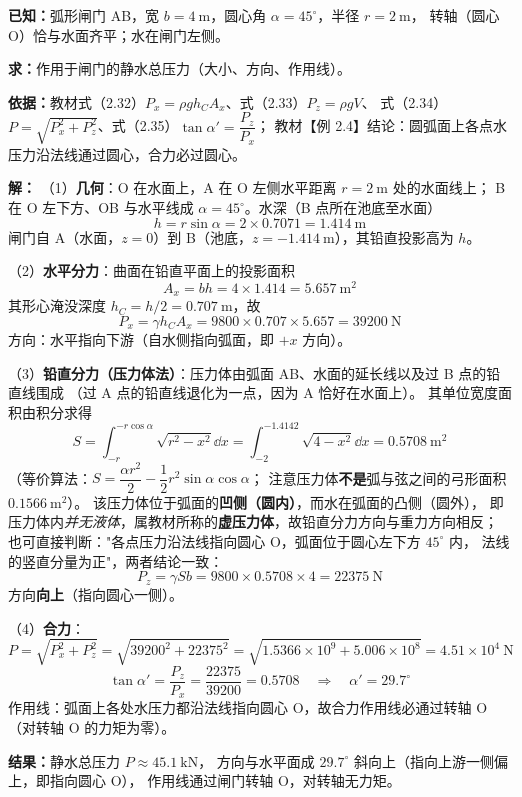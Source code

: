 \begin{jie}
\textbf{已知：}弧形闸门 AB，宽 $b=4\ \mathrm{m}$，圆心角 $\alpha=45^{\circ}$，半径 $r=2\ \mathrm{m}$，
转轴（圆心 O）恰与水面齐平；水在闸门左侧。

\textbf{求：}作用于闸门的静水总压力（大小、方向、作用线）。

\textbf{依据：}教材式（2.32）$P_x=\rho gh_CA_x$、式（2.33）$P_z=\rho gV$、
式（2.34）$P=\sqrt{P_x^2+P_z^2}$、式（2.35）$\tan\alpha'=\dfrac{P_z}{P_x}$；
教材【例 2.4】结论：圆弧面上各点水压力沿法线通过圆心，合力必过圆心。

\textbf{解：}
（1）\textbf{几何}：O 在水面上，A 在 O 左侧水平距离 $r=2\ \mathrm{m}$ 处的水面线上；
B 在 O 左下方、OB 与水平线成 $\alpha=45^{\circ}$。水深（B 点所在池底至水面）
\[ h=r\sin\alpha=2\times0.7071=1.414\ \mathrm{m} \]
闸门自 A（水面，$z=0$）到 B（池底，$z=-1.414\ \mathrm{m}$），其铅直投影高为 $h$。

（2）\textbf{水平分力}：曲面在铅直平面上的投影面积
\[ A_x=bh=4\times1.414=5.657\ \mathrm{m^2} \]
其形心淹没深度 $h_C=h/2=0.707\ \mathrm{m}$，故
\[ P_x=\gamma h_CA_x=9800\times0.707\times5.657=39200\ \mathrm{N} \]
方向：水平指向下游（自水侧指向弧面，即 $+x$ 方向）。

（3）\textbf{铅直分力（压力体法）}：压力体由弧面 AB、水面的延长线以及过 B 点的铅直线围成
（过 A 点的铅直线退化为一点，因为 A 恰好在水面上）。
其单位宽度面积由积分求得
\[ S=\int_{-r}^{-r\cos\alpha}\sqrt{r^2-x^2}\dd x=\int_{-2}^{-1.4142}\sqrt{4-x^2}\dd x=0.5708\ \mathrm{m^2} \]
（等价算法：$S=\dfrac{\alpha r^2}{2}-\dfrac{1}{2}r^2\sin\alpha\cos\alpha$；
注意压力体\textbf{不是}弧与弦之间的弓形面积 $0.1566\ \mathrm{m^2}$）。
该压力体位于弧面的\textbf{凹侧（圆内）}，而水在弧面的凸侧（圆外），
即压力体内\emph{并无液体}，属教材所称的\textbf{虚压力体}，故铅直分力方向与重力方向相反；
也可直接判断："各点压力沿法线指向圆心 O，弧面位于圆心左下方 $45^{\circ}$ 内，
法线的竖直分量为正"，两者结论一致：
\[ P_z=\gamma Sb=9800\times0.5708\times4=22375\ \mathrm{N} \]
方向\textbf{向上}（指向圆心一侧）。

（4）\textbf{合力}：
\[ P=\sqrt{P_x^2+P_z^2}=\sqrt{39200^2+22375^2}=\sqrt{1.5366\times10^9+5.006\times10^8}
=4.51\times10^4\ \mathrm{N} \]
\[ \tan\alpha'=\frac{P_z}{P_x}=\frac{22375}{39200}=0.5708\quad\Rightarrow\quad
\alpha'=29.7^{\circ} \]
作用线：弧面上各处水压力都沿法线指向圆心 O，故合力作用线必通过转轴 O
（对转轴 O 的力矩为零）。

\textbf{结果：}静水总压力 $P\approx45.1\ \mathrm{kN}$，
方向与水平面成 $29.7^{\circ}$ 斜向上（指向上游一侧偏上，即指向圆心 O），
作用线通过闸门转轴 O，对转轴无力矩。
\end{jie}

